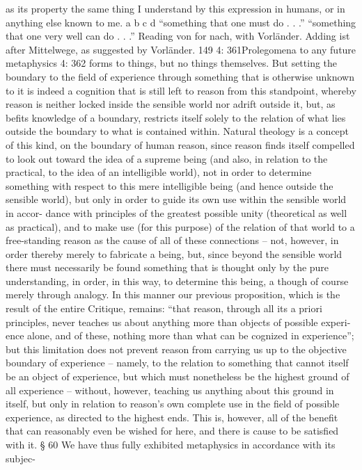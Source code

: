 as its property the same thing I understand by this expression in humans, or in
anything else known to me.
a
b
c
d
“something that one must do . . .”
“something that one very well can do . . .”
Reading von for nach, with Vorländer.
Adding ist after Mittelwege, as suggested by Vorländer.
149
4: 361Prolegomena to any future metaphysics
4: 362
forms to things, but no things themselves. But setting the boundary to
the ﬁeld of experience through something that is otherwise unknown to
it is indeed a cognition that is still left to reason from this standpoint,
whereby reason is neither locked inside the sensible world nor adrift
outside it, but, as beﬁts knowledge of a boundary, restricts itself solely
to the relation of what lies outside the boundary to what is contained
within.
Natural theology is a concept of this kind, on the boundary of human
reason, since reason ﬁnds itself compelled to look out toward the idea of
a supreme being (and also, in relation to the practical, to the idea of an
intelligible world), not in order to determine something with respect to
this mere intelligible being (and hence outside the sensible world), but
only in order to guide its own use within the sensible world in accor-
dance with principles of the greatest possible unity (theoretical as well
as practical), and to make use (for this purpose) of the relation of that
world to a free-standing reason as the cause of all of these connections –
not, however, in order thereby merely to fabricate a being, but, since
beyond the sensible world there must necessarily be found something
that is thought only by the pure understanding, in order, in this way, to
determine this being, a though of course merely through analogy.
In this manner our previous proposition, which is the result of the
entire Critique, remains: “that reason, through all its a priori principles,
never teaches us about anything more than objects of possible experi-
ence alone, and of these, nothing more than what can be cognized in
experience”; but this limitation does not prevent reason from carrying
us up to the objective boundary of experience – namely, to the relation to
something that cannot itself be an object of experience, but which must
nonetheless be the highest ground of all experience – without, however,
teaching us anything about this ground in itself, but only in relation to
reason’s own complete use in the ﬁeld of possible experience, as directed
to the highest ends. This is, however, all of the beneﬁt that can reasonably
even be wished for here, and there is cause to be satisﬁed with it.
§ 60
We have thus fully exhibited metaphysics in accordance with its subjec-
